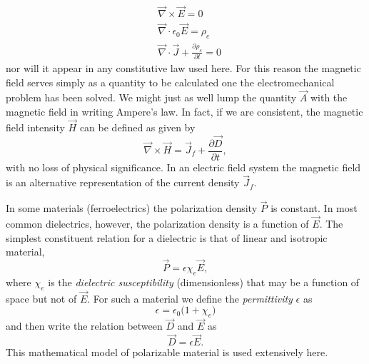 \documentclass[12pt,a4paper,oneside]{book}
\begin{document}
\begin{onehalfspace}
\begin{equation*}\label{}
	\begin{aligned}
		&\vec{\nabla}\times\vec{E}=0 \\[6pt]
		&\vec{\nabla}\cdot\epsilon_0\vec{E} = \rho_{e}\\[6pt]
		&\vec{\nabla}\cdot\vec{J}+\frac{\partial \rho_{e}}{\partial t}=0
	\end{aligned}
\end{equation*}
nor will it appear in any constitutive law used here. For this reason the magnetic field serves simply as a quantity to be calculated one the electromechanical problem has been solved. We might just as well lump the quantity $\vec{A}$ with the magnetic field in writing Ampere's law. In fact, if we are consistent, the magnetic field intensity $\vec{H}$ can be defined as given by
 \begin{equation}\label{constitutive_eq_20}
\vec{\nabla}\times\vec{H}=\vec{J}_f+\frac{\partial \vec{D}}{\partial t},
 \end{equation}
with no loss of physical significance. In an electric field system the magnetic field is an alternative representation of the current density $\vec{J}_f$. 

In some materials (ferroelectrics) the polarization density $\vec{P}$ is constant. In most common dielectrics, however, the polarization density is a function of $\vec{E}$. The simplest constituent relation for a dielectric is that of linear and isotropic material,
\begin{equation}\label{constitutive_eq_21}
	\vec{P}=\epsilon\chi_e\vec{E},
\end{equation}
where $\chi_e$ is the \textit{dielectric susceptibility} (dimensionless) that may be a function of space but not of $\vec{E}$. For such a material we define the \textit{permittivity} $\epsilon$ as
\begin{equation}\label{constitutive_eq_22}
	\epsilon=\epsilon_0\big(1+\chi_e\big)
\end{equation}
and then write the relation between $\vec{D}$ and $\vec{E}$ as
\begin{equation}\label{constitutive_eq_23}
	\vec{D}=\epsilon\vec{E}.
\end{equation}
This mathematical model of polarizable material is used extensively here. 

\end{onehalfspace}
\end{document}
